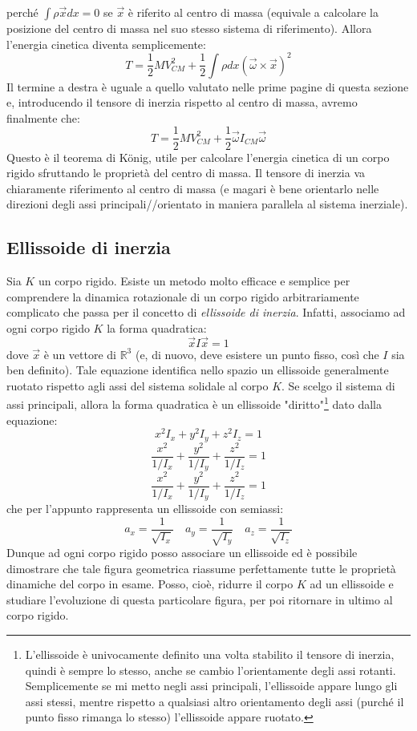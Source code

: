 \documentclass[a4paper,openany]{article}
\begin{document}
	perché $\int \rho\vec{x} dx = 0$ se $\vec{x}$ è riferito al centro di massa (equivale a calcolare la posizione del centro di massa nel suo stesso sistema di riferimento). Allora l'energia cinetica diventa semplicemente:
	$$
	T = \dfrac{1}{2}MV_{CM}^{2} + \dfrac{1}{2}\int \rho dx (\vec\omega \times \vec{x})^{2}
	$$
	Il termine a destra è uguale a quello valutato nelle prime pagine di questa sezione e, introducendo il tensore di inerzia rispetto al centro di massa, avremo finalmente che:
	\begin{equation}\label{key}
		T = \dfrac{1}{2}MV_{CM}^{2} + \dfrac{1}{2}\vec{\omega}I_{CM}\vec\omega
	\end{equation}
	Questo è il teorema di König, utile per calcolare l'energia cinetica di un corpo rigido sfruttando le proprietà del centro di massa. Il tensore di inerzia va chiaramente riferimento al centro di massa (e magari è bene orientarlo nelle direzioni degli assi principali//orientato in maniera parallela al sistema inerziale).
	\subsection{Ellissoide di inerzia}
	Sia $K$ un corpo rigido. Esiste un metodo molto efficace e semplice per comprendere la dinamica rotazionale di un corpo rigido arbitrariamente complicato che passa per il concetto di \textit{ellissoide di inerzia}. Infatti, associamo ad ogni corpo rigido $K$ la forma quadratica:
	$$
	\vec{x}I\vec{x} = 1
	$$
	dove $\vec{x}$ è un vettore di $\mathbb{R}^{3}$ (e, di nuovo, deve esistere un punto fisso, così che $I$ sia ben definito). Tale equazione identifica nello spazio un ellissoide generalmente ruotato rispetto agli assi del sistema solidale al corpo $K$. Se scelgo il sistema di assi principali, allora la forma quadratica è un ellissoide "diritto"\footnote{L'ellissoide è univocamente definito una volta stabilito il tensore di inerzia, quindi è sempre lo stesso, anche se cambio l'orientamente degli assi rotanti. Semplicemente se mi metto negli assi principali, l'ellissoide appare lungo gli assi stessi, mentre rispetto a qualsiasi altro orientamento degli assi (purché il punto fisso rimanga lo stesso) l'ellissoide appare ruotato.} dato dalla equazione:
	$$
	x^{2}I_{x} + y^{2}I_{y}+ z^{2}I_{z} = 1
	$$
	$$
	\dfrac{x^{2}}{1/I_x} + \dfrac{y^{2}}{1/I_y} + \dfrac{z^{2}}{1/I_z} = 1
	$$
	$$
	\dfrac{x^{2}}{1/I_x} + \dfrac{y^{2}}{1/I_y} + \dfrac{z^{2}}{1/I_z} = 1
	$$
	che per l'appunto rappresenta un ellissoide con semiassi:
	$$
	a_{x} = \dfrac{1}{\sqrt{I_x}} \quad a_{y} = \dfrac{1}{\sqrt{I_y}} \quad a_{z} = \dfrac{1}{\sqrt{I_z}}
	$$
	Dunque ad ogni corpo rigido posso associare un ellissoide ed è possibile dimostrare che tale figura geometrica riassume perfettamente tutte le proprietà dinamiche del corpo in esame. Posso, cioè, ridurre il corpo $K$ ad un ellissoide e studiare l'evoluzione di questa particolare figura, per poi ritornare in ultimo al corpo rigido. 
	
\end{document}
